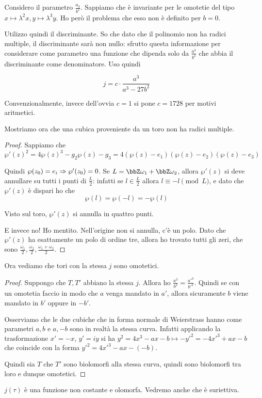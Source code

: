 	Considero il parametro $\frac{a_3}{b^2}$. Sappiamo che è invariante per le omotetie del tipo $x\mapsto \lambda^2x, y\mapsto\lambda^3y$. Ho però il problema che esso non è definito per $b=0$.

	Utilizzo quindi il discriminante. So che dato che il polinomio non ha radici multiple, il discriminante sarà non nullo: sfrutto questa informazione per considerare come parametro una funzione che dipenda solo da $\frac{a^3}{b^2}$ che abbia il discriminante come denominatore. Uso quindi
	
	\[
		j = c \cdot \frac {a^3}{a^3-27b^2}
	\]

	Convenzionalmente, invece dell'ovvia $c = 1$ si pone $c = 1728$ per motivi aritmetici.
	
	Mostriamo ora che una cubica proveniente da un toro non ha radici multiple.
	
	\begin{proof}
		Sappiamo che 
		\[
			\wp'(z)^2=4\wp(z)^3-g_2\wp(z)-g_3 = 4(\wp(z)-e_1)(\wp(z)-e_2)(\wp(z)-e_3)
		\]
		
		Quindi $\wp(z_0)=e_i \Rightarrow\wp'(z_0)=0$.
		Se $L=\bbZ\omega_1 + \bbZ\omega_2$, allora $\wp'(z)$ si deve annullare su tutti i punti di $\frac L2$: infatti se $l \in \frac L2$ allora $l \equiv -l \pmod L$, e dato che $\wp'(z)$ è dispari ho che 
		\[
			\wp(l) = \wp(-l) = -\wp(l)
		\]
		
		Visto sul toro, $\wp'(z)$ si annulla in quattro punti.
		
		E invece no! Ho mentito. Nell'origine non si annulla, c'è un polo. Dato che $\wp'(z)$ ha esattamente un polo di ordine tre, allora ho trovato tutti gli zeri, che sono $\frac{\omega_1}2, \frac{\omega_2}2, \frac{\omega_1+\omega_2}2$.
		

	\end{proof}

	Ora vediamo che tori con la stessa $j$ sono omotetici.
	
	\begin{proof}
          Suppongo che $T, T'$ abbiano la stessa $j$. Allora ho $\frac{a^3}{b^2}=\frac{a'^3}{b'^2}$. Quindi se con un omotetia faccio in modo che $a$ venga mandato in $a'$, allora sicuramente $b$ viene mandato in $b'$ oppure in $-b'$.

          Osserviamo che le due cubiche che in forma normale di Weierstrass hanno come parametri $a, b$ e $a, -b$ sono in realtà la stessa curva. Infatti applicando la trasformazione $x' = -x$, $y' = iy$ si ha $y^2 = 4x^3 - ax - b \mapsto - y'^2 = - 4x'^3 + ax - b$ che coincide con la forma $y'^2 = 4x'^3 - ax - (-b)$.
		
          Quindi sia $T$ che $T'$ sono biolomorfi alla stessa curva, quindi sono biolomorfi tra loro e dunque omotetici.
	\end{proof}
	
	\begin{osservazione}
		$j(\tau)$ è una funzione non costante e olomorfa. Vedremo anche che è suriettiva.
	\end{osservazione}

